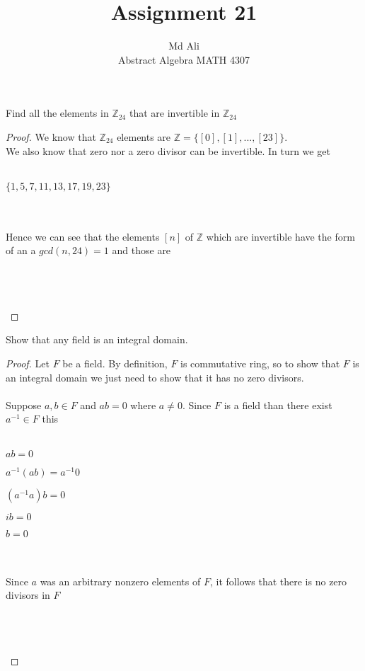 \documentclass[12pt]{article}
\newenvironment{problem}[2][Problem]{\begin{trivlist}
\item[\hskip \labelsep {\bfseries #1}\hskip \labelsep {\bfseries #2.}]}{\end{trivlist}}
\begin{document}
 
 
\title{Assignment 21}%
\author{Md Ali\\ %
Abstract Algebra MATH 4307} %
 
\maketitle
 
\begin{problem}{4.1.1} %
Find all the elements in $\mathbb{Z}_{24}$ that are invertible in $\mathbb{Z}_24$
\end{problem}
 
\begin{proof}
We know that $\mathbb{Z}_{24}$ elements are $\mathbb{Z} = \{ [0],[1],...,[23] \}$.\\
We also know that zero nor a zero divisor can be invertible. In turn we get \\ \\
\centerline{ $\{1,5,7,11,13,17,19,23\}$} \\ \\

Hence we can see that the elements $[n]$ of $\mathbb{Z}$ which are invertible have the form of an a $gcd(n,24)=1$ and those are \\ \\
\centerline{\fbox{$ [1],[5],[7],[11],[13],[17],[19],[23]$}} \\ \\
\end{proof}

\begin{problem}{4.1.2}
Show that any field is an integral domain. 
\end{problem}

\begin{proof}
Let $F$ be a field. By definition, $F$ is commutative ring, so to show that $F$ is an integral domain we just need to show that it has no zero divisors. \\ \\
Suppose $a,b \in F$ and $ab =0$ where $a \neq 0$. Since $F$ is a field than there exist $a^{-1} \in F$ this \\ \\
\centerline{$ab=0$} 
\centerline{$a^{-1}(ab)=a^{-1}0$}
\centerline{$(a^{-1}a)b=0$}
\centerline{$ib=0$}
\centerline{$b=0$}\\ \\
Since $a$ was an arbitrary nonzero elements of $F$, it follows that there is no zero divisors in $F$ \\ \\
\centerline{} \\ \\
\end{proof}
\end{document}
